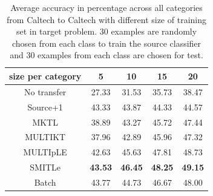\begin{table}[h]
  \centering
  \caption{Average accuracy in percentage across all categories from Caltech to Caltech with different size of training set in target problem. 30 examples are randomly chosen from each class to train the source classifier and 30 examples from each class are chosen for test. }
    \begin{tabular}{ccccc}
    \toprule
      size per category    & 5     & 10    & 15    & 20 \\
    \midrule
    No transfer &         27.33  &         31.53  &         35.73  &         38.47  \\
    Source+1    &         43.33  &         43.87   &         44.33  &         44.57   \\
    MKTL        &         38.89  &         43.27   &         45.72  &         47.44   \\
    MULTIKT     &         37.96  &         42.89   &         45.96  &         47.32  \\
    MULTIpLE    &         42.63  &         45.63   &         47.81  &         48.73 \\
    SMITLe        &         \textbf{43.53 }&         \textbf{46.45 } &         \textbf{48.25 } &         \textbf{49.15 } \\
        \midrule
    Batch       &         43.77  &         44.73   &         46.67  &         48.00 \\
    \bottomrule
    \end{tabular}%
  \label{tab:C2C}%
\end{table}%

